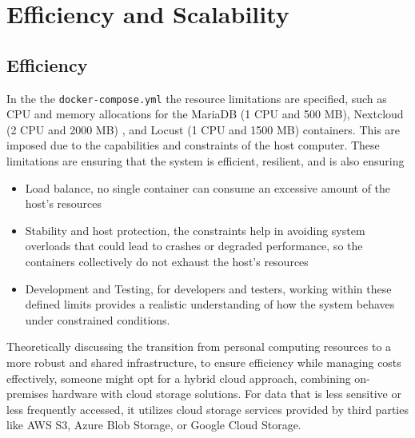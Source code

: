 \documentclass[12pt]{article}
\begin{document}



\section{Efficiency and Scalability}
\label{sec:scalability}
\subsection{Efficiency}
In the the \verb|docker-compose.yml| the resource limitations are specified, such as CPU and memory allocations for the MariaDB (1 CPU and 500 MB), Nextcloud (2 CPU and 2000 MB) , and Locust (1 CPU and 1500 MB) containers. This are imposed due to the capabilities and constraints of the host computer. These limitations are ensuring that the system is efficient, resilient, and is also ensuring
\begin{itemize}
    \item Load balance, no single container can consume an excessive amount of the host's resources
    \item Stability and host protection, the constraints help in avoiding system overloads that could lead to crashes or degraded performance, so the containers collectively do not exhaust the host’s resources
    \item Development and Testing, for developers and testers, working within these defined limits provides a realistic understanding of how the system behaves under constrained conditions. 
\end{itemize}

Theoretically discussing the transition from personal computing resources to a more robust and shared infrastructure, to ensure efficiency while managing costs effectively, someone might opt for a hybrid cloud approach, combining on-premises hardware with cloud storage solutions. For data that is less sensitive or less frequently accessed, it utilizes cloud storage services provided by third parties like AWS S3, Azure Blob Storage, or Google Cloud Storage.
\end{document}
